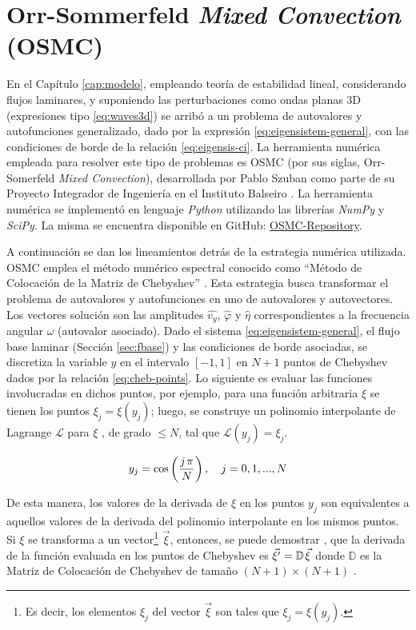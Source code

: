 \section{Orr-Sommerfeld \textit{Mixed Convection} (OSMC)}

En el Capítulo \ref{cap:modelo}, empleando teoría de estabilidad lineal, considerando flujos laminares, y suponiendo las perturbaciones como ondas planas 3D (expresiones tipo \ref{eq:waves3d}) se arribó a un problema de autovalores y autofunciones generalizado, dado por la expresión \ref{eq:eigensistem-general}, con las condiciones de borde de la relación \ref{eq:eigensis-ci}. La herramienta numérica empleada para resolver este tipo de problemas es OSMC (por sus siglas, Orr-Somerfeld \textit{Mixed Convection}), desarrollada por Pablo Szuban como parte de su Proyecto Integrador de Ingeniería en el Instituto Balseiro \cite{szuban2023}. La herramienta numérica se implementó en lenguaje \textit{Python} utilizando las librerías \textit{NumPy} y \textit{SciPy}. La misma se encuentra disponible en GitHub: \href{https://github.com/Pato4184/OSMC-Repository}{OSMC-Repository}.

A continuación se dan los lineamientos detrás de la estrategia numérica utilizada. OSMC emplea el método numérico espectral conocido como ``Método de Colocación de la Matriz de Chebyshev'' \cite{moin2010fundamentals}. Esta estrategia busca transformar el problema de autovalores y autofunciones en uno de autovalores y autovectores. Los vectores solución son las amplitudes $\widehat{v_y}$, $\widehat{\varphi}$ y $\widehat{\eta}$ correspondientes a la frecuencia angular $\omega$ (autovalor asociado). Dado el sistema \ref{eq:eigensistem-general}, el flujo base laminar (Sección \ref{sec:fbase}) y las condiciones de borde asociadas, se discretiza la variable $y$ en el intervalo $\left[-1,1\right]$ en $N+1$ puntos de Chebyshev dados por la relación \ref{eq:cheb-points}. Lo siguiente es evaluar las funciones involucradas en dichos puntos, por ejemplo, para una función arbitraria $\xi$ se tienen los puntos $\xi_j = \xi(y_j)$; luego, se construye un polinomio interpolante de Lagrange $\mathcal{L}$ para $\xi$ , de grado $\leq N$, tal que $\mathcal{L}(y_j) = \xi_j$.

\begin{equation}
y_j = \cos \left( \frac{j \hspace{0.5mm} \pi}{N} \right), \quad j=0,1,...,N 
\label{eq:cheb-points}
\end{equation}

De esta manera, los valores de la derivada de $\xi$ en los puntos $y_j$ son equivalentes a aquellos valores de la derivada del polinomio interpolante en los mismos puntos. Si $\xi$ se transforma a un vector\footnote{Es decir, los elementos $\xi_j$ del vector $\vec{\xi}$ son tales que $\xi_j = \xi(y_j)$.} $\vec{\xi}$, entonces, se puede demostrar \cite{moin2010fundamentals}, que la derivada de la función evaluada en los puntos de Chebyshev es $\vec{\xi^{\prime}} = \mathbb{D} \hspace{0.4mm} \vec{\xi}$ donde $\mathbb{D}$ es la Matriz de Colocación de Chebyshev de tamaño $(N+1) \times (N+1)$ \cite{trefethen}.

